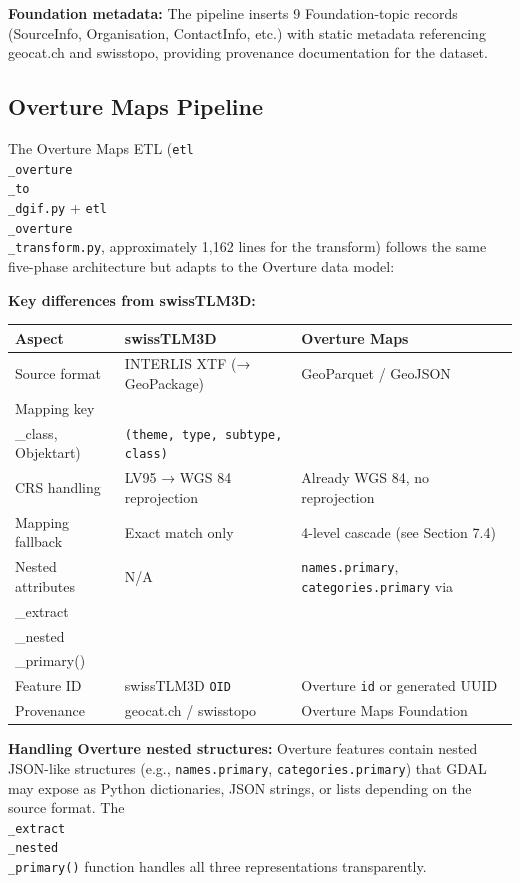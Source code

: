 \documentclass[conference]{IEEEtran}
\begin{document}
\textbf{Foundation metadata:}
The pipeline inserts 9 Foundation-topic records (SourceInfo, Organisation, ContactInfo, etc.) with static metadata referencing geocat.ch and swisstopo, providing provenance documentation for the dataset.

\subsection{Overture Maps Pipeline}

The Overture Maps ETL (\texttt{etl\\_overture\\_to\\_dgif.py} + \texttt{etl\\_overture\\_transform.py}, approximately 1,162 lines for the transform) follows the same five-phase architecture but adapts to the Overture data model:

\textbf{Key differences from swissTLM3D:}

\begin{center}
\begin{longtable}{p{}p{}p{}}
Aspect & swissTLM3D & Overture Maps \\
\midrule
Source format & INTERLIS XTF (→ GeoPackage) & GeoParquet / GeoJSON \\
Mapping key & \texttt{(TLM\\_class, Objektart)} & \texttt{(theme, type, subtype, class)} \\
CRS handling & LV95 → WGS 84 reprojection & Already WGS 84, no reprojection \\
Mapping fallback & Exact match only & 4-level cascade (see Section 7.4) \\
Nested attributes & N/A & \texttt{names.primary}, \texttt{categories.primary} via \texttt{\\_extract\\_nested\\_primary()} \\
Feature ID & swissTLM3D \texttt{OID} & Overture \texttt{id} or generated UUID \\
Provenance & geocat.ch / swisstopo & Overture Maps Foundation \\
\end{longtable}
\end{center}


\textbf{Handling Overture nested structures:}
Overture features contain nested JSON-like structures (e.g., \texttt{names.primary}, \texttt{categories.primary}) that GDAL may expose as Python dictionaries, JSON strings, or lists depending on the source format. The \texttt{\\_extract\\_nested\\_primary()} function handles all three representations transparently.
\end{document}
